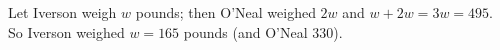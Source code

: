Let Iverson weigh $w$ pounds; then O'Neal weighed $2w$ and $w+2w=3w=495$. So Iverson weighed $w=\boxed{165}$ pounds (and O'Neal $330$).
